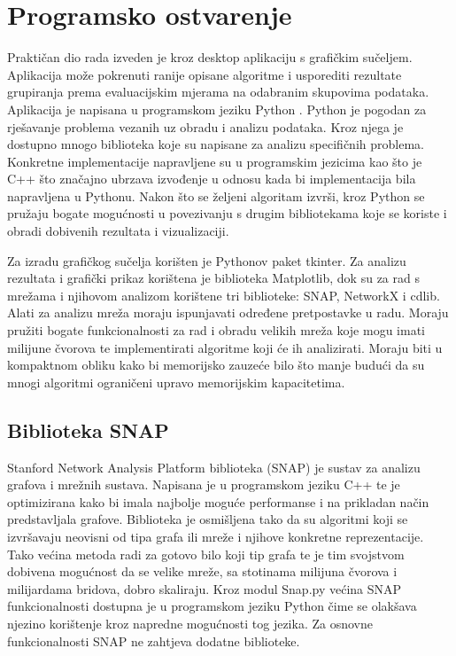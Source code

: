 \chapter{Programsko ostvarenje}

Praktičan dio rada izveden je kroz desktop aplikaciju s grafičkim sučeljem. Aplikacija može pokrenuti ranije opisane algoritme i usporediti rezultate grupiranja prema evaluacijskim mjerama na odabranim skupovima podataka. Aplikacija je napisana u programskom jeziku Python \cite{van1995python}. Python je pogodan za rješavanje problema vezanih uz obradu i analizu podataka. Kroz njega je dostupno mnogo biblioteka koje su napisane za analizu specifičnih problema. Konkretne implementacije napravljene su u programskim jezicima kao što je C++ što značajno ubrzava izvođenje u odnosu kada bi implementacija bila napravljena u Pythonu. Nakon što se željeni algoritam izvrši, kroz Python se pružaju bogate mogućnosti u povezivanju s drugim bibliotekama koje se koriste i obradi dobivenih rezultata i vizualizaciji.

Za izradu grafičkog sučelja korišten je Pythonov paket tkinter. Za analizu rezultata i grafički prikaz korištena je biblioteka Matplotlib, dok su za rad s mrežama i njihovom analizom korištene tri biblioteke: SNAP, NetworkX i cdlib. Alati za analizu mreža moraju ispunjavati određene pretpostavke u radu. Moraju pružiti bogate funkcionalnosti za rad i obradu velikih mreža koje mogu imati milijune čvorova te implementirati algoritme koji će ih analizirati. Moraju biti u kompaktnom obliku kako bi memorijsko zauzeće bilo što manje	budući da su mnogi algoritmi ograničeni upravo memorijskim kapacitetima.

\section{Biblioteka SNAP}
Stanford Network Analysis Platform biblioteka (SNAP) \cite{leskovec2016snap} je sustav za analizu grafova i mrežnih sustava. Napisana je u programskom jeziku C++ te je optimizirana kako bi imala najbolje moguće performanse i na prikladan način predstavljala grafove. Biblioteka je osmišljena tako da su algoritmi koji se izvršavaju neovisni od tipa grafa ili mreže i njihove konkretne reprezentacije. Tako većina metoda radi za gotovo bilo koji tip grafa te je tim svojstvom dobivena mogućnost da se velike mreže, sa stotinama milijuna čvorova i milijardama bridova, dobro skaliraju. Kroz modul Snap.py većina SNAP funkcionalnosti dostupna je u programskom jeziku Python čime se olakšava njezino korištenje kroz napredne mogućnosti tog jezika. Za osnovne funkcionalnosti SNAP ne zahtjeva dodatne biblioteke. 

